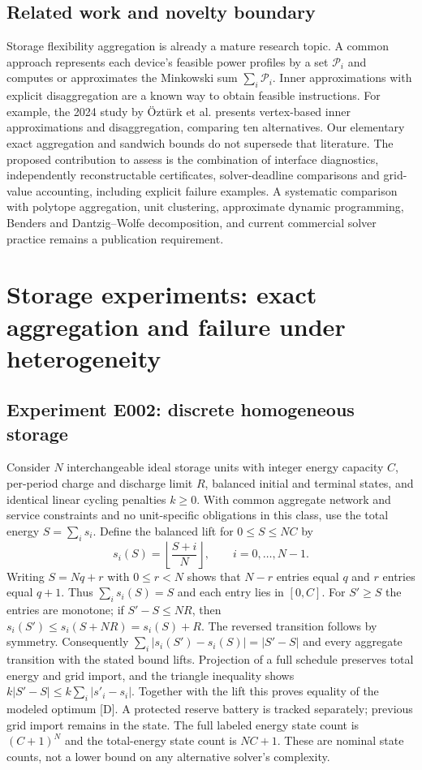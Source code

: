 \documentclass[11pt,letterpaper]{article}
\begin{document}
\subsection{Related work and novelty boundary}
Storage flexibility aggregation is already a mature research topic. A common approach represents each device's feasible power profiles by a set $\mathcal P_i$ and computes or approximates the Minkowski sum $\sum_i\mathcal P_i$. Inner approximations with explicit disaggregation are a known way to obtain feasible instructions. For example, the 2024 study by \"Ozt\"urk et al. \cite{minkowski} presents vertex-based inner approximations and disaggregation, comparing ten alternatives. Our elementary exact aggregation and sandwich bounds do not supersede that literature. The proposed contribution to assess is the combination of interface diagnostics, independently reconstructable certificates, solver-deadline comparisons and grid-value accounting, including explicit failure examples. A systematic comparison with polytope aggregation, unit clustering, approximate dynamic programming, Benders and Dantzig--Wolfe decomposition, and current commercial solver practice remains a publication requirement.

\section{Storage experiments: exact aggregation and failure under heterogeneity}
\label{sec:storage}
\subsection{Experiment E002: discrete homogeneous storage}
Consider $N$ interchangeable ideal storage units with integer energy capacity $C$, per-period charge and discharge limit $R$, balanced initial and terminal states, and identical linear cycling penalties $k\ge0$. With common aggregate network and service constraints and no unit-specific obligations in this class, use the total energy $S=\sum_i s_i$. Define the balanced lift for $0\le S\le NC$ by
\[
s_i(S)=\left\lfloor\frac{S+i}{N}\right\rfloor,\qquad i=0,\ldots,N-1.
\]
Writing $S=Nq+r$ with $0\le r<N$ shows that $N-r$ entries equal $q$ and $r$ entries equal $q+1$. Thus $\sum_i s_i(S)=S$ and each entry lies in $[0,C]$. For $S'\ge S$ the entries are monotone; if $S'-S\le NR$, then $s_i(S')\le s_i(S+NR)=s_i(S)+R$. The reversed transition follows by symmetry. Consequently $\sum_i|s_i(S')-s_i(S)|=|S'-S|$ and every aggregate transition with the stated bound lifts. Projection of a full schedule preserves total energy and grid import, and the triangle inequality shows $k|S'-S|\le k\sum_i|s'_i-s_i|$. Together with the lift this proves equality of the modeled optimum [D]. A protected reserve battery is tracked separately; previous grid import remains in the state. The full labeled energy state count is $(C+1)^N$ and the total-energy state count is $NC+1$. These are nominal state counts, not a lower bound on any alternative solver's complexity.
\end{document}
